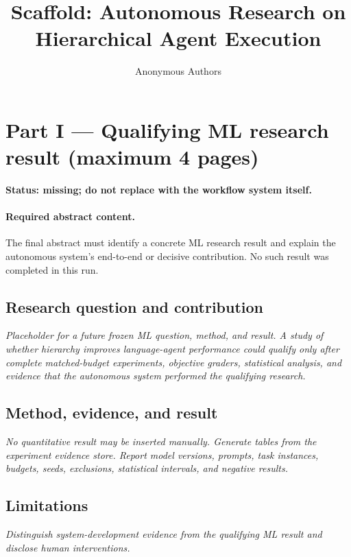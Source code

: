 \documentclass{article}
\title{Scaffold: Autonomous Research on Hierarchical Agent Execution}
\author{Anonymous Authors}
\begin{document}
\maketitle
\begin{center}
\end{center}

\section*{Part I --- Qualifying ML research result (maximum 4 pages)}
\textbf{Status: missing; do not replace with the workflow system itself.}

\paragraph{Required abstract content.} The final abstract must identify a concrete ML research result and explain the autonomous system's end-to-end or decisive contribution. No such result was completed in this run.

\subsection*{Research question and contribution}
\textit{Placeholder for a future frozen ML question, method, and result. A study of whether hierarchy improves language-agent performance could qualify only after complete matched-budget experiments, objective graders, statistical analysis, and evidence that the autonomous system performed the qualifying research.}

\subsection*{Method, evidence, and result}
\textit{No quantitative result may be inserted manually. Generate tables from the experiment evidence store. Report model versions, prompts, task instances, budgets, seeds, exclusions, statistical intervals, and negative results.}

\subsection*{Limitations}
\textit{Distinguish system-development evidence from the qualifying ML result and disclose human interventions.}
\end{document}
